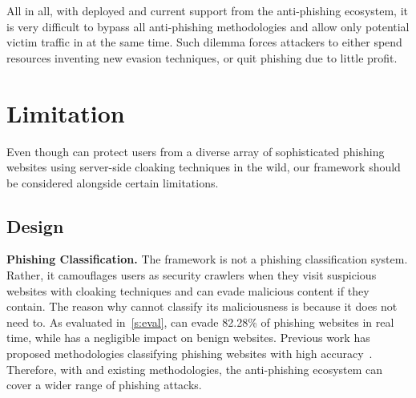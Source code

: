 
All in all, with \spartacus deployed and current support from the anti-phishing ecosystem, 
it is very difficult to bypass all anti-phishing methodologies and allow only potential victim traffic in at the same time.
Such dilemma forces attackers to either spend resources inventing new evasion techniques, or quit phishing due to little profit.


\section{Limitation}

Even though \spartacus can protect users from a diverse array of sophisticated phishing websites using server-side cloaking techniques in the wild,
our framework should be considered alongside certain limitations.


\subsection{\spartacus Design}

\noindent
\textbf{Phishing Classification.}
The \spartacus framework is not a phishing classification system.
Rather, it camouflages users as security crawlers when they visit suspicious websites with cloaking techniques and can evade malicious content if they contain.
The reason why \spartacus cannot classify its maliciousness is because it does not need to.
As evaluated in~\autoref{s:eval}, \spartacus can evade 82.28\% of phishing websites in real time, while has a negligible impact on benign websites.
Previous work has proposed methodologies classifying phishing websites with high accuracy~\cite{whittaker2010large, lin2021phishpedia}.
Therefore, with \spartacus and existing methodologies, the anti-phishing ecosystem can cover a wider range of phishing attacks.


